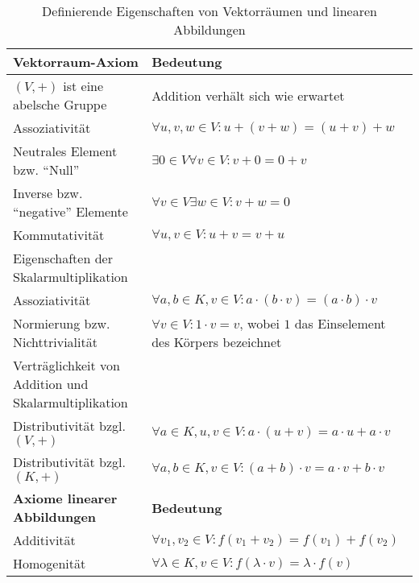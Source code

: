 \begin{definition}
\begin{table}[!ht]
\begin{tabularx}{\textwidth}{p{7cm} X}
		\toprule
		\textbf{Vektorraum-Axiom}                            & \textbf{Bedeutung} \\
		\midrule
        $(V,+)$ ist eine abelsche Gruppe                     & Addition verhält sich wie erwartet \\
		\hspace{1cm}Assoziativität                           & $\forall u,v,w\in V: u+(v+w) = (u+v)+w$  \\
		\hspace{1cm}Neutrales Element bzw. \enquote{Null}    & $\exists 0\in V\forall v\in V: v+0=0+v$  \\
		\hspace{1cm}Inverse bzw. \enquote{negative} Elemente & $\forall v \in V\exists w \in V: v+w=0$ \\
        \hspace{1cm}Kommutativität                           & $\forall u,v\in V: u+v=v+u$ \\
        Eigenschaften der Skalarmultiplikation \\
		\hspace{1cm}Assoziativität                           & $\forall a,b\in K, v\in V: a\cdot(b\cdot v) = (a\cdot b)\cdot v$ \\
		\hspace{1cm}Normierung bzw. Nichttrivialität         & $\forall v \in V: 1 \cdot v = v$, wobei $1$ das Einselement des Körpers bezeichnet \\
        Verträglichkeit von Addition und Skalarmultiplikation \\
		\hspace{1cm}Distributivität bzgl. $(V,+)$            & $\forall a\in K, u,v\in V: a\cdot(u + v) = a\cdot u + a\cdot v$ \\
		\hspace{1cm}Distributivität bzgl. $(K,+)$            & $\forall a,b\in K, v\in V: (a + b)\cdot v = a\cdot v + b\cdot v$ \\
        \midrule
        \textbf{Axiome linearer Abbildungen}                  & \textbf{Bedeutung} \\
        \midrule
        Additivität & $\forall v_1,v_2\in V: f(v_1+v_2) = f(v_1)+f(v_2)$ \\
        Homogenität & $\forall \lambda\in K, v\in V: f(\lambda\cdot v) = \lambda \cdot f(v)$ \\
        \bottomrule
	\end{tabularx}
	\caption{Definierende Eigenschaften von Vektorräumen und linearen Abbildungen}
    \label{vektorraeume:def_table}
\end{table}


\end{definition}
